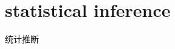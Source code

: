 \documentclass[../../main.tex]{subfiles}
\begin{document}
\section{statistical inference}
统计推断
\end{document}
